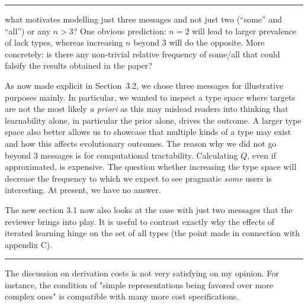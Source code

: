 \documentclass[12pt,a4paper]{article}
\begin{document}
%
\noindent\rule{\textwidth}{1pt}

\begin{mdframed}[backgroundcolor=gray!25,linecolor=gray!25,frametitle= Reviewer \thereviewerCounter~comment \thereviewerCommentCounter \hfill ~~({\it message amount})]
%
what motivates modelling just three messages and not just two (``some'' and ``all'') or any $n>3$? One obvious prediction: $n=2$ will lead to larger prevalence of lack types, whereas increasing $n$ beyond $3$ will do the opposite. More concretely: is there any non-trivial relative frequency of some/all that could falsify the results obtained in the paper?

%
\end{mdframed}

As now made explicit in Section~3.2, we chose three messages for illustrative purposes mainly. In particular, we wanted to inspect a type space where targets are not the most likely {\em a priori} as this may mislead readers into thinking that learnability alone, in particular the prior alone, drives the outcome. A larger type space also better allows us to showcase that multiple kinds of a type may exist and how this affects evolutionary outcomes. The reason why we did not go beyond $3$ messages is for computational tractability. Calculating $Q$, even if approximated, is expensive. The question whether increasing the type space will decrease the frequency to which we expect to see pragmatic {\em some} users is interesting. At present, we have no answer. 

The new section 3.1 now also looks at the case with just two messages that the reviewer brings into play. It is useful to contrast exactly why the effects of iterated learning hinge on the set of all types (the point made in connection with appendix C).



\noindent\rule{\textwidth}{1pt}

\begin{mdframed}[backgroundcolor=gray!25,linecolor=gray!25,frametitle= Reviewer \thereviewerCounter~comment \thereviewerCommentCounter \hfill ~~({\it LOT \& complexity})]
%
The discussion on derivation costs is not very satisfying on my opinion. For instance, the condition of "simple representations being favored over more complex ones" is compatible with many more cost specifications.

%
\end{mdframed}
\end{document}
